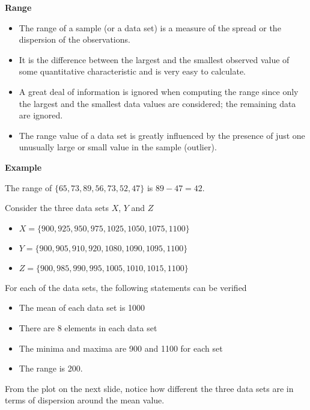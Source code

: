 \documentclass[]{report}
\begin{document}
\noindent \textbf{Range}

\begin{itemize}
	\item The range of a sample (or a data set) is a measure of the spread or the dispersion of the observations. \item It is the difference between the largest and the smallest observed value of some quantitative characteristic and is very easy to calculate.
	
	\item A great deal of information is ignored when computing the range since only the largest and the smallest data values are considered; the remaining data are ignored.
	
	\item The range value of a data set is greatly influenced by the presence of just one unusually large or small value in the sample (outlier).
\end{itemize}

\textbf{Example}


The range of $\{65,73,89,56,73,52,47\}$ is $ 89-47 = 42$.



Consider the three data sets $X$, $Y$ and $Z$
\begin{itemize}
	\item $X= \{900,925,950,975,1025,1050,1075,1100 \}$
	\item $Y=\{900,905,910,920,1080,1090,1095,1100\}$
	\item $Z=\{900,985,990,995,1005,1010,1015,1100\}$
\end{itemize}

For each of the data sets, the following statements can be verified

\begin{itemize}
	\item The mean of each data set is 1000
	\item There are 8 elements in each data set
	\item The minima and maxima are 900 and 1100 for each set
	\item The range is 200.
\end{itemize}

From the plot on the next slide, notice how different the three data sets are in terms of dispersion around the mean value.
\end{document}
